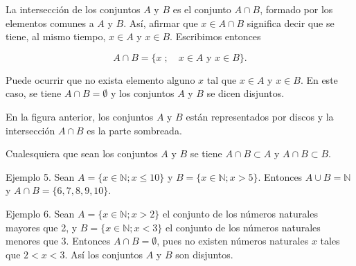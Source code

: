 La intersección de los conjuntos \(A\) y \(B\) es el conjunto \(A \cap B\), formado por los elementos comunes a \(A\) y \(B\). Así, afirmar que \(x \in A \cap B\) significa decir que se tiene, al mismo tiempo, \(x \in A\) y \(x \in B\). Escribimos entonces

\[
A \cap B = \{x \; ; \quad x \in A \text{ y } x \in B\}.
\]

Puede ocurrir que no exista elemento alguno \(x\) tal que \(x \in A\) y \(x \in B\). En este caso, se tiene \(A \cap B = \emptyset\) y los conjuntos \(A\) y \(B\) se dicen disjuntos.

\begin{center}
  \centering
\end{center}

En la figura anterior, los conjuntos \(A\) y \(B\) están representados por discos y la intersección \(A \cap B\) es la parte sombreada.

Cualesquiera que sean los conjuntos \(A\) y \(B\) se tiene \(A \cap B \subset A\) y \(A \cap B \subset B\).

Ejemplo 5. Sean \(A = \{x \in \mathbb{N}; x \leq 10\}\) y \(B = \{x \in \mathbb{N}; x > 5\}\). Entonces \(A \cup B = \mathbb{N}\) y \(A \cap B = \{6, 7, 8, 9, 10\}\).

Ejemplo 6. Sean \(A = \{x \in \mathbb{N}; x > 2\}\) el conjunto de los números naturales mayores que 2, y \(B = \{x \in \mathbb{N}; x < 3\}\) el conjunto de los números naturales menores que 3. Entonces \(A \cap B = \emptyset\), pues no existen números naturales \(x\) tales que \(2 < x < 3\). Así los conjuntos \(A\) y \(B\) son disjuntos.

